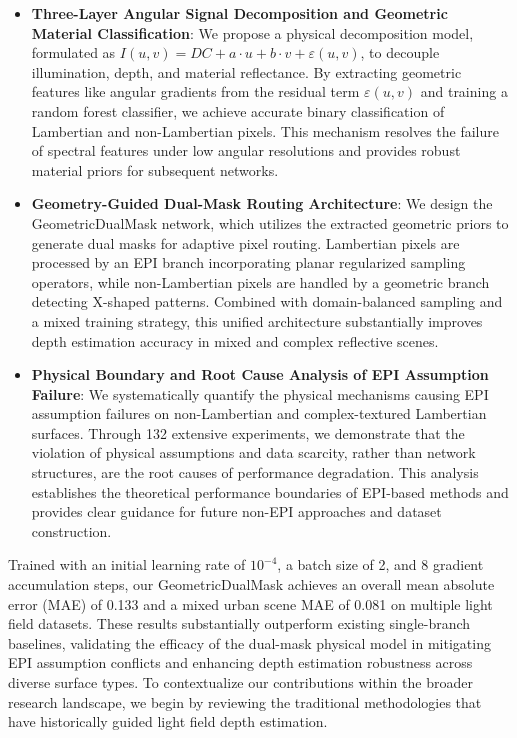 \documentclass[lettersize,journal]{IEEEtran}
\begin{document}
\begin{itemize}
\item \textbf{Three-Layer Angular Signal Decomposition and Geometric Material Classification}: We propose a physical decomposition model, formulated as $I(u,v) = DC + a \cdot u + b \cdot v + \varepsilon(u,v)$, to decouple illumination, depth, and material reflectance. By extracting geometric features like angular gradients from the residual term $\varepsilon(u,v)$ and training a random forest classifier, we achieve accurate binary classification of Lambertian and non-Lambertian pixels. This mechanism resolves the failure of spectral features under low angular resolutions and provides robust material priors for subsequent networks.

\item \textbf{Geometry-Guided Dual-Mask Routing Architecture}: We design the GeometricDualMask network, which utilizes the extracted geometric priors to generate dual masks for adaptive pixel routing. Lambertian pixels are processed by an EPI branch incorporating planar regularized sampling operators, while non-Lambertian pixels are handled by a geometric branch detecting X-shaped patterns. Combined with domain-balanced sampling and a mixed training strategy, this unified architecture substantially improves depth estimation accuracy in mixed and complex reflective scenes.

\item \textbf{Physical Boundary and Root Cause Analysis of EPI Assumption Failure}: We systematically quantify the physical mechanisms causing EPI assumption failures on non-Lambertian and complex-textured Lambertian surfaces. Through 132 extensive experiments, we demonstrate that the violation of physical assumptions and data scarcity, rather than network structures, are the root causes of performance degradation. This analysis establishes the theoretical performance boundaries of EPI-based methods and provides clear guidance for future non-EPI approaches and dataset construction.
\end{itemize}

Trained with an initial learning rate of $10^{-4}$, a batch size of 2, and 8 gradient accumulation steps, our GeometricDualMask achieves an overall mean absolute error (MAE) of 0.133 and a mixed urban scene MAE of 0.081 on multiple light field datasets. These results substantially outperform existing single-branch baselines, validating the efficacy of the dual-mask physical model in mitigating EPI assumption conflicts and enhancing depth estimation robustness across diverse surface types. To contextualize our contributions within the broader research landscape, we begin by reviewing the traditional methodologies that have historically guided light field depth estimation.
\end{document}
